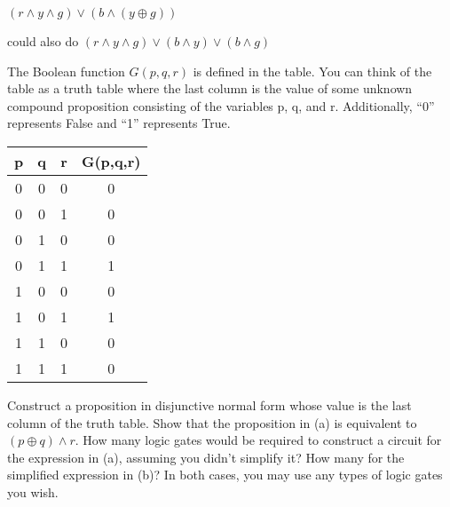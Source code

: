 \documentclass[solution, letterpaper]{cs20}
\begin{document}
\begin{solution}

\subsolution $(r \land y \land g) \lor (b \land (y \oplus g))$

could also do 
$(r \land y \land g) \lor (b \land y) \lor (b \land g)$

\end{solution}


The Boolean function $G(p,q,r)$ is defined in the table. You can think of the table as a truth table where the last column is the value of some unknown compound proposition consisting of the variables p, q, and r. Additionally, ``0'' represents False and ``1'' represents True. 


\begin{table}[h]
\centering

\begin{tabular}{| c c c | c |}
\hline
p & q & r & G(p,q,r) \\ \hline
0 & 0 & 0 & 0 \\ 
0 & 0 & 1 & 0 \\ 
0 & 1 & 0 & 0 \\ 
0 & 1 & 1 & 1 \\ 
1 & 0 & 0 & 0 \\ 
1 & 0 & 1 & 1 \\ 
1 & 1 & 0 & 0 \\ 
1 & 1 & 1 & 0 \\ \hline

\end{tabular}
\end{table}

\subproblem Construct a proposition in disjunctive normal form whose value is the last column of the truth table. 
\subproblem Show that the proposition in (a) is equivalent to $(p \oplus q)\land r$.
\subproblem How many logic gates would be required to construct a circuit for the expression in (a), assuming you didn't simplify it? How many for the simplified expression in (b)?  In both cases, you may use any types of logic gates you wish.
\end{document}
